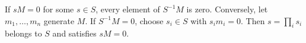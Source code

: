 If $sM=0$ for some $s\in S$, every element of $S^{-1}M$ is zero. Conversely, let $m_1,\ldots,m_n$ generate $M$. If $S^{-1}M=0$, choose $s_i\in S$ with $s_im_i=0$. Then $s=\prod_i s_i$ belongs to $S$ and satisfies $sM=0$.
